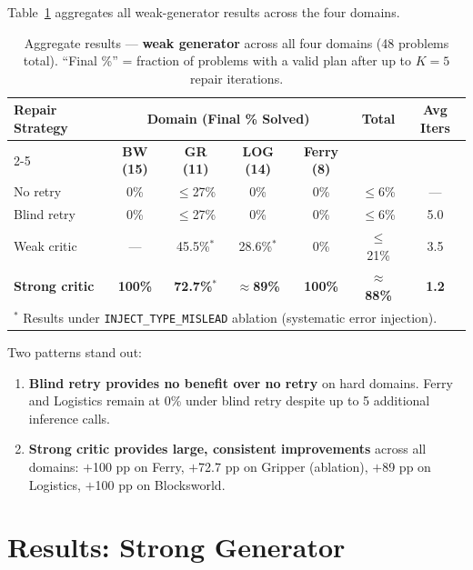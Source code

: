 \documentclass{article}
\begin{document}
Table~\ref{tab:agg_weak} aggregates all weak-generator results across the four domains.

\begin{table}[h]
\centering
\caption{Aggregate results --- \textbf{weak generator} across all four domains (48 problems total).
         ``Final \%'' = fraction of problems with a valid plan after up to $K{=}5$ repair iterations.}
\label{tab:agg_weak}
\begin{tabular}{lcccccc}
\toprule
\multirow{2}{*}{\textbf{Repair Strategy}} &
  \multicolumn{4}{c}{\textbf{Domain (Final \% Solved)}} &
  \multirow{2}{*}{\textbf{Total}} &
  \multirow{2}{*}{\textbf{Avg Iters}} \\
\cmidrule{2-5}
  & \textbf{BW (15)} & \textbf{GR (11)} & \textbf{LOG (14)} & \textbf{Ferry (8)} & & \\
\midrule
No retry          & 0\%  & $\leq$27\% & 0\%  & 0\%   & $\leq$6\%   & --- \\
Blind retry       & 0\%  & $\leq$27\% & 0\%  & 0\%   & $\leq$6\%   & 5.0 \\
Weak critic       & ---  & 45.5\%$^*$ & 28.6\%$^*$ & 0\%  & $\leq$21\%  & 3.5 \\
\textbf{Strong critic} & \textbf{100\%} & \textbf{72.7\%}$^*$ & $\approx$\textbf{89\%} & \textbf{100\%} & $\approx$\textbf{88\%} & \textbf{1.2} \\
\bottomrule
\multicolumn{7}{l}{\footnotesize $^*$ Results under \texttt{INJECT\_TYPE\_MISLEAD} ablation (systematic error injection).}
\end{tabular}
\end{table}

Two patterns stand out:
\begin{enumerate}[leftmargin=1.5em]
  \item \textbf{Blind retry provides no benefit over no retry} on hard domains.  Ferry
        and Logistics remain at 0\% under blind retry despite up to 5 additional
        inference calls.
  \item \textbf{Strong critic provides large, consistent improvements} across all domains:
        $+$100 pp on Ferry, $+$72.7 pp on Gripper (ablation), $+$89 pp on Logistics,
        $+$100 pp on Blocksworld.
\end{enumerate}

\section{Results: Strong Generator}
\label{sec:results_strong}
\end{document}
